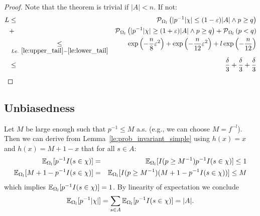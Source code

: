 \begin{proof}
Note that the theorem is trivial if $|A| < n$. If not:
\begin{eqnarray*}
  L & \leq & \operatorname{\mathcal P}_{\Omega_l} \left( | p^{-1} |\chi| \leq (1-\varepsilon) |A| \wedge p \geq q \right)\\
  & + &
    \operatorname{\mathcal P}_{\Omega_l} \left( | p^{-1} |\chi| \geq (1+\varepsilon) |A| \wedge p \geq q \right) +
    \operatorname{\mathcal P}_{\Omega_l} \left( p < q \right) \\
    & \underset{Le.~\ref{le:upper_tail}-\ref{le:lower_tail}}{\leq} &
    \exp\left( - \frac{n}{8} \varepsilon^2 \right)  + \exp\left( - \frac{n}{12} \varepsilon^2 \right) +
    l \exp\left( - \frac{n}{12} \right) \\
    & \leq & \frac{\delta}{3} + \frac{\delta}{3} + \frac{\delta}{3}
\end{eqnarray*}
\end{proof}
\subsection{Unbiasedness\label{sec:unbiasedness}}
Let $M$ be large enough such that $p^{-1} \leq M$ a.s. (e.g., we can choose $M = f^{-l}$).
Then we can derive from Lemma~\ref{le:prob_invariant_simple} using $h(x) = x$ and $h(x) = M+1-x$ that
for all $s \in A$:
\begin{eqnarray*}
  \operatorname{\mathbb E}_{\Omega_l} [ p^{-1} I(s \in \chi) ] & = &
    \operatorname{\mathbb E}_{\Omega_l} [ I(p \geq M^{-1}) p^{-1} I(s \in \chi) ] \leq 1 \\
  \operatorname{\mathbb E}_{\Omega_l} [ M + 1 - p^{-1} I(s \in \chi) ] & = &
    \operatorname{\mathbb E}_{\Omega_l} [ I(p \geq M^{-1}) (M + 1 - p^{-1} I(s \in \chi)) ] \leq M
\end{eqnarray*}
which implies $\operatorname{\mathbb E}_{\Omega_l} [ p^{-1} I(s \in \chi) ] = 1$.
By linearity of expectation we conclude
\[
  \operatorname{\mathbb E}_{\Omega_l} [ p^{-1} |\chi| ] =
    \sum_{s \in A} \operatorname{\mathbb E}_{\Omega_l} [ p^{-1} I(s \in \chi) ] = |A| \textrm{.}
\]
